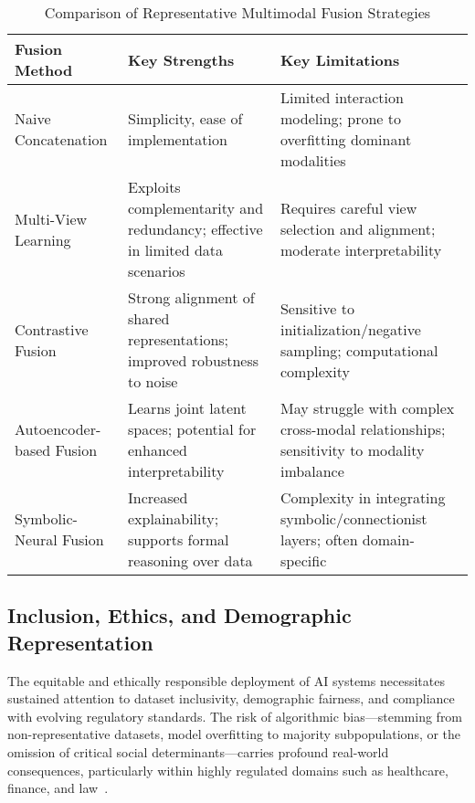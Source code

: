 \documentclass[sigconf]{acmart}
\begin{document}
\begin{table*}[htbp]
\centering
\caption{Comparison of Representative Multimodal Fusion Strategies}
\label{tab:fusion_comparison}
\begin{adjustbox}{max width=\textwidth}
\begin{tabular}{lll}
\toprule
\textbf{Fusion Method} & \textbf{Key Strengths} & \textbf{Key Limitations} \\
\midrule
Naive Concatenation & Simplicity, ease of implementation & Limited interaction modeling; prone to overfitting dominant modalities \\
Multi-View Learning & Exploits complementarity and redundancy; effective in limited data scenarios & Requires careful view selection and alignment; moderate interpretability \\
Contrastive Fusion & Strong alignment of shared representations; improved robustness to noise & Sensitive to initialization/negative sampling; computational complexity \\
Autoencoder-based Fusion & Learns joint latent spaces; potential for enhanced interpretability & May struggle with complex cross-modal relationships; sensitivity to modality imbalance \\
Symbolic-Neural Fusion & Increased explainability; supports formal reasoning over data & Complexity in integrating symbolic/connectionist layers; often domain-specific\\
\bottomrule
\end{tabular}
\end{adjustbox}
\end{table*}

\subsection{Inclusion, Ethics, and Demographic Representation}

The equitable and ethically responsible deployment of AI systems necessitates sustained attention to dataset inclusivity, demographic fairness, and compliance with evolving regulatory standards. The risk of algorithmic bias—stemming from non-representative datasets, model overfitting to majority subpopulations, or the omission of critical social determinants—carries profound real-world consequences, particularly within highly regulated domains such as healthcare, finance, and law~\cite{ref1,ref2,ref10,ref21,ref22,ref23,ref42,ref43,ref44,ref49,ref52,ref53,ref65}.
\end{document}
